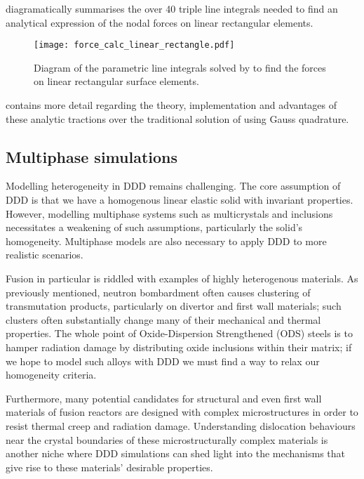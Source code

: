  diagramatically summarises the over 40 triple line integrals needed to find an analytical expression of the nodal forces on linear rectangular elements.
\begin{figure}
    \centering
    \texttt{[image: force\_calc\_linear\_rectangle.pdf]}
    \caption[Analytic tractions on linear rectangular surface elements.]{Diagram of the parametric line integrals solved by \citet{analytic_tractions} to find the forces on linear rectangular surface elements.}
    \label{f:force_lin_rectIntro}
\end{figure}
 contains more detail regarding the theory, implementation and advantages of these analytic tractions over the traditional solution of using Gauss quadrature.

\subsection{Multiphase simulations}
\label{ss:multiphase}

Modelling heterogeneity in DDD remains challenging. The core assumption of DDD is that we have a homogenous linear elastic solid with invariant properties. However, modelling multiphase systems such as multicrystals and inclusions necessitates a weakening of such assumptions, particularly the solid's homogeneity. Multiphase models are also necessary to apply DDD to more realistic scenarios.

Fusion in particular is riddled with examples of highly heterogenous materials. As previously mentioned, neutron bombardment often causes clustering of transmutation products, particularly on divertor and first wall materials; such clusters often substantially change many of their mechanical and thermal properties. The whole point of Oxide-Dispersion Strengthened (ODS) steels \cite{ddd_ods} is to hamper radiation damage by distributing oxide inclusions within their matrix; if we hope to model such alloys with DDD we must find a way to relax our homogeneity criteria.

Furthermore, many potential candidates for structural and even first wall materials of fusion reactors are designed with complex microstructures in order to resist thermal creep and radiation damage. Understanding dislocation behaviours near the crystal boundaries of these microstructurally complex materials is another niche where DDD simulations can shed light into the mechanisms that give rise to these materials' desirable properties.


